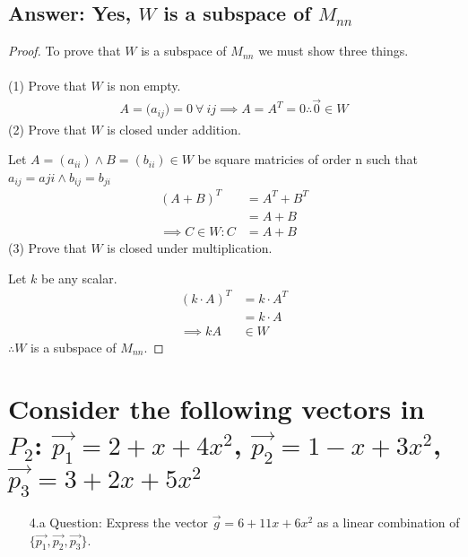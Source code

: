 \documentclass[11pt]{article}
\begin{document}
\subsection{Answer: Yes, $W$ is a subspace of $M_{nn}$}
\begin{proof}
        To prove that $W$ is a subspace of $M_{nn}$ we must show three things.\\\\
        (1) Prove that $W$ is non empty.
        \begin{align*}
                A=({a_{ij})=0}\ \forall\ ij \implies A = A^{T}=0 \therefore \vec{0} \in W
        \end{align*}
        (2) Prove that $W$ is closed under addition.

        Let $A = ({a_{ii}})\land B = ({b_{ii}})\in W$ be square matricies of order n such that $a_{ij}=a{ji}\land b_{ij} = b_{ji}$\
        \begin{align*}
                (A+B)^T             & = A^T+B^T \\
                                    & = A + B   \\
                \implies C\in W : C & = A+B
        \end{align*}
        (3) Prove that $W$ is closed under multiplication.

        Let ${k}$ be any scalar.
        \begin{align*}
                (k\cdot A)^{T} & = k\cdot A^{T} \\
                               & = k\cdot A     \\
                \implies kA    & \in W
        \end{align*}
        $\therefore W$ is a subspace of $M_{nn}$.
\end{proof} \pagebreak
\section{Consider the following vectors in $P_2$: $\vec{p_1} = 2 + x + 4x^2$, $\vec{p_2} = 1 - x + 3x^2$, $\vec{p_3} = 3 + 2x + 5x^2$}
\begin{enumerate}
        \item[4.a]Question: Express the vector $\vec{g} = 6 + 11x + 6x^2$ as a linear combination of $\{\vec{p_1},\vec{p_2},\vec{p_3}\}$.
\end{enumerate}
\end{document}
